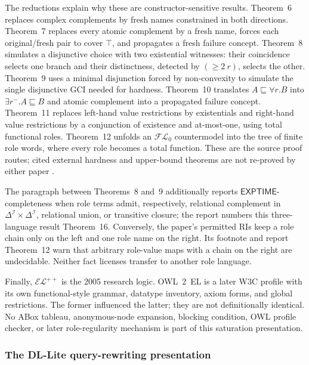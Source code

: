The reductions explain why these are constructor-sensitive results.  Theorem~6
replaces complex complements by fresh names constrained in both directions.
Theorem~7 replaces every atomic complement by a fresh name, forces each
original/fresh pair to cover \(\top\), and propagates a fresh failure concept.
Theorem~8 simulates a disjunctive choice with two existential witnesses: their
coincidence selects one branch and their distinctness, detected by
\((\geq2\ r)\), selects the other.  Theorem~9 uses a minimal disjunction forced
by non-convexity to simulate the single disjunctive GCI needed for hardness.
Theorem~10 translates \(A\sqsubseteq\forall r.B\) into
\(\exists r^{-}.A\sqsubseteq B\) and atomic complement into a propagated
failure concept.  Theorem~11 replaces left-hand value restrictions by
existentials and right-hand value restrictions by a conjunction of existence
and at-most-one, using total functional roles.  Theorem~12 unfolds an
\(\mathcal{FL}_0\) countermodel into the tree of finite role words, where every
role becomes a total function.  These are the source proof routes; cited
external hardness and upper-bound theorems are not re-proved by either paper
\cite[\S4, thms.~6--12]{BaaderBrandtLutz2005}
\cite[\S\S5--6]{BaaderBrandtLutz2005TR}.

The paragraph between Theorems~8 and~9 additionally reports
\(\mathsf{EXPTIME}\)-completeness when role terms admit, respectively,
relational complement in \(\Delta^{\mathcal I}\times\Delta^{\mathcal I}\),
relational union, or transitive closure; the report numbers this
three-language result Theorem~16.  Conversely, the paper's permitted RIs keep
a role chain only on the left and one role name on the right.  Its footnote and
report Theorem~12 warn that arbitrary role-value maps with a chain on the
right are undecidable.  Neither fact licenses transfer to another role
language.

Finally, \(\mathcal{EL}^{++}\) is the 2005 research logic.  OWL~2~EL is a
later W3C profile with its own functional-style grammar, datatype inventory,
axiom forms, and global restrictions.  The former influenced the latter; they
are not definitionally identical.  No ABox tableau, anonymous-node expansion,
blocking condition, OWL profile checker, or later role-regularity mechanism is
part of this saturation presentation.

\subsubsection{The DL-Lite query-rewriting presentation}
\label{sec:p09-dl-lite-query-rewriting}

